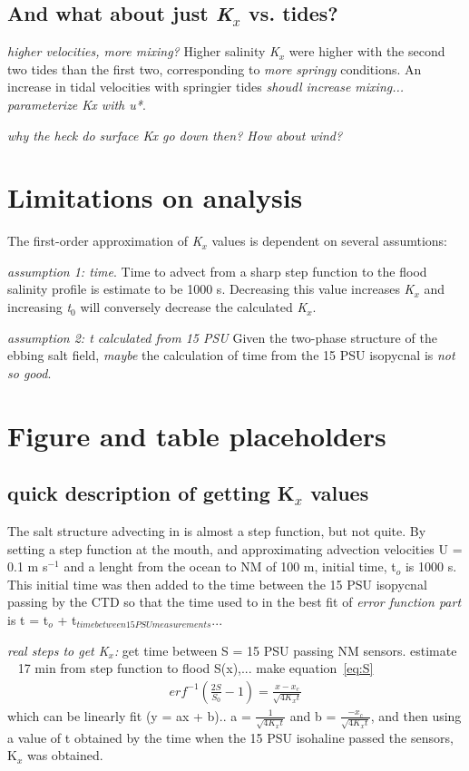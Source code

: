 \subsection{And what about just \emph{K$_x$} vs. tides?}
\emph{higher velocities, more mixing?}
Higher salinity \emph{K$_x$} were higher with the second two tides than the first two, corresponding to \emph{more springy} conditions. An increase in tidal velocities with springier tides \emph{shoudl increase mixing... parameterize Kx with u*}. 

\emph{why the heck do surface Kx go down then? How about wind?}

\section{Limitations on analysis}

The first-order approximation of \emph{K$_x$} values is dependent on several assumtions: 

\emph{assumption 1: time}. Time to advect from a sharp step function to the flood salinity profile is estimate to be 1000 s. Decreasing this value increases \emph{K$_x$} and increasing \emph{t$_0$} will conversely decrease the calculated \emph{K$_x$}. 

\emph{assumption 2: t calculated from 15 PSU} Given the two-phase structure of the ebbing salt field, \emph{maybe} the calculation of time from the 15 PSU isopycnal is \emph{not so good}. 


\section{Figure and table placeholders}



\subsection{quick description of getting K$_x$ values}
The salt structure advecting in is almost a step function, but not quite. By setting a step function at the mouth, and approximating advection velocities U = 0.1 m s$^{-1}$ and a lenght from the ocean to NM of 100 m, initial time, t$_o$ is 1000 s. This initial time was then added to the time between the 15 PSU isopycnal passing by the CTD so that the time used to in the best fit of \emph{error function part} is t = t$_o$ + t$_{time between 15 PSU measurements}$... 

\emph{real steps to get K$_x$:} get time between S = 15 PSU passing NM sensors.  estimate ~ 17 min from step function to flood S(x),... make equation~\ref{eq:S} 
\begin{eqnarray}
erf^{-1}\left(\frac{2S}{S_0}-1\right) = \frac{x-x_c}{\sqrt{4K_xt}} \label{eq:linfitS}
\end{eqnarray}
which can be linearly fit (y = ax + b).. a = $\frac{1}{\sqrt{4K_xt}}$ and b = $\frac{-x_c}{\sqrt{4K_xt}}$, and then using a value of t obtained by the time when the 15 PSU isohaline passed the sensors, K$_x$ was obtained.  



